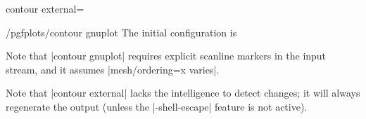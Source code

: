 {{\begin{plottype}[/pgfplots]{
    contour external=\textcolor{black}{}%
}
    \begin{stylekey}{/pgfplots/contour gnuplot}
    \label{key:pgfplots:contour:gnuplot}
        The initial configuration is
\begin{codeexample}
\end{codeexample}
        Note that |contour gnuplot| requires explicit scanline markers in the
        input stream, and it assumes |mesh/ordering=x varies|.
    \end{stylekey}

    Note that |contour external| lacks the intelligence to detect changes; it
    will always regenerate the output (unless the |-shell-escape| feature is
    not active).
\end{plottype}

%
%
%

}}
